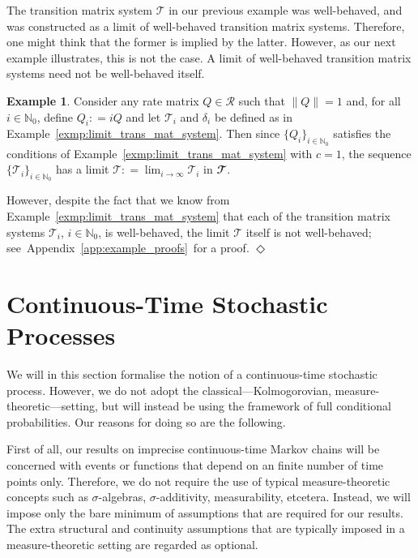 \documentclass[10pt,a4paper]{paper}
\theoremstyle{definition}
\newtheorem{exmp}{Example}
\newcommand{\nats}{\mathbb{N}}
\newcommand{\norm}[1]{\left\lVert #1 \right\rVert}
\newcommand{\coloneqq}{:\!=}
\newcommand{\exampleend}{\hfill$\Diamond$}
\newcommand{\exampleproofref}{Appendix~\ref{app:example_proofs}}
\begin{document}
The transition matrix system $\mathcal{T}$ in our previous example was well-behaved, and was constructed as a limit of well-behaved transition matrix systems. Therefore, one might think that the former is implied by the latter. However, as our next example illustrates, this is not the case. A limit of well-behaved transition matrix systems need not be well-behaved itself.

\begin{exmp}\label{exmp:notwellbehavedMarkov}
Consider any rate matrix $Q\in\mathcal{R}$ such that $\norm{Q}=1$ and, for all $i\in\nats_0$, define $Q_i\coloneqq iQ$ and let $\mathcal{T}_i$ and $\delta_i$ be defined as in Example~\ref{exmp:limit_trans_mat_system}. Then since $\{Q_i\}_{i\in\nats_0}$ satisfies the conditions of Example~\ref{exmp:limit_trans_mat_system} with $c=1$, the sequence $\{\mathcal{T}_i\}_{i\in\nats_0}$ has a limit $\mathcal{T}\coloneqq \lim_{i\to\infty}\mathcal{T}_i$ in $\mathbfcal{T}$. 

However, despite the fact that we know from Example~\ref{exmp:limit_trans_mat_system} that each of the transition matrix systems $\mathcal{T}_i$, $i\in\nats_0$, is well-behaved, the limit $\mathcal{T}$ itself is not well-behaved; see~\exampleproofref~for a proof.
\exampleend
\end{exmp}

\section{Continuous-Time Stochastic Processes}\label{sec:stochastic_processes}

We will in this section formalise the notion of a continuous-time stochastic process. However, we do not adopt the classical---Kolmogorovian, measure-theoretic---setting, but will instead be using the framework of full conditional probabilities. Our reasons for doing so are the following.


First of all, our results on imprecise continuous-time Markov chains will be concerned with events or functions that depend on an finite number of time points only. Therefore, we do not require the use of typical measure-theoretic concepts such as $\sigma$-algebras, $\sigma$-additivity, measurability, etcetera. Instead, we will impose only the bare minimum of assumptions that are required for our results. The extra structural and continuity assumptions that are typically imposed in a measure-theoretic setting are regarded as optional.
\end{document}
